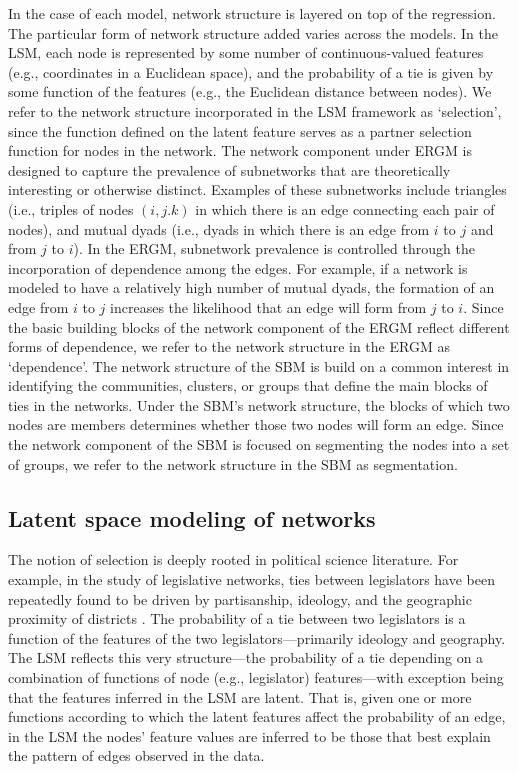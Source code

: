 \documentclass[fleqn,12pt]{wlscirep}
\begin{document}
In the case of each model, network structure is layered on top of the regression. The particular form of network structure added varies across the models. In the LSM, each node is represented by some number of continuous-valued features (e.g., coordinates in a Euclidean space), and the probability of a tie is given by some function of the features (e.g., the Euclidean distance between nodes). We refer to the network structure incorporated in the LSM framework as `selection', since the function defined on the latent feature serves as a partner selection function for nodes in the network. The network component under ERGM is designed to capture the prevalence of subnetworks that are theoretically interesting or otherwise distinct. Examples of these subnetworks include triangles (i.e., triples of nodes $(i,j.k)$ in which there is an edge connecting each pair of nodes), and mutual dyads (i.e., dyads in which there is an edge from $i$ to $j$ and from $j$ to $i$). In the ERGM, subnetwork prevalence is controlled through the incorporation of dependence among the edges. For example, if a network is modeled to have a relatively high number of mutual dyads, the formation of an edge from $i$ to $j$ increases the likelihood that an edge will form from $j$ to $i$. Since the basic building blocks of the network component of the ERGM reflect different forms of dependence, we refer to the network structure in the ERGM as `dependence'. The network structure of the SBM is build on a common interest in identifying the communities, clusters, or groups that define the main blocks of ties in the networks. Under the SBM's network structure, the blocks of which two nodes are members determines whether those two nodes will form an edge. Since the network component of the SBM is focused on segmenting the nodes into a set of groups, we refer to the network structure in the SBM as segmentation.

\subsection{Latent space modeling of networks}




The notion of selection is deeply rooted in political science literature. For example,  in  the study of legislative networks, ties between legislators have been repeatedly found to be driven by partisanship, ideology, and the geographic proximity of districts \citep{osei2018party,bratton2011networks,clark2013multimember}.   The probability of a tie between two legislators is a function of the features of the two legislators---primarily ideology and geography. The LSM reflects this very structure---the probability of a tie depending on a combination of functions of node (e.g., legislator) features---with exception being that the features inferred in the LSM are latent. That is, given one or more functions according to which the latent features affect the probability of an edge,  in the LSM the nodes' feature values are inferred to be those that best explain the pattern of edges observed in the data.
\end{document}
